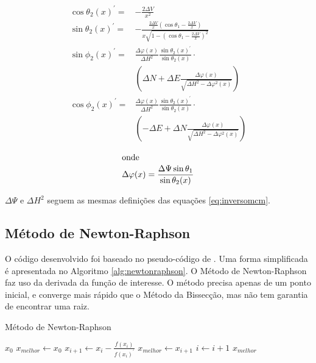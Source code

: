 \documentclass[final,5p]{elsarticle}
\numberwithin{equation}{section}
\begin{document}
    \begin{subequations}\label{eq:inversomcmprime}
    \begin{align}
        \cos \theta_2(x)^{\prime} =& - \frac{2 \Delta V}{x^2} \label{eq:costheta2prime} \\
        \sin \theta_2(x)^{\prime} =& - \frac{\frac{2 \Delta V}{x}(\cos \theta_1 - \frac{2 \Delta V}{x})}{x \sqrt{1-\left(\cos \theta_1 - \frac{2 \Delta V}{x} \right)^2}} \label{eq:sintheta2prime} \\
        \sin \phi_2(x)^{\prime} =& \frac{\Delta \varphi(x)}{\Delta H^2} \frac{\sin \theta_2(x)^{\prime}}{\sin \theta_2(x)} \cdot \nonumber \\
        &\left( \Delta N + \Delta E \frac{\Delta \varphi(x)}{\sqrt{\Delta H^2 - \Delta \varphi^2(x)}} \right) \label{eq:sinphi2prime} \\
        \cos \phi_2(x)^{\prime} =& \frac{\Delta \varphi(x)}{\Delta H^2} \frac{\sin \theta_2(x)^{\prime}}{\sin \theta_2(x)} \cdot \nonumber \\
        &\left( -\Delta E + \Delta N \frac{\Delta \varphi(x)}{\sqrt{\Delta H^2 - \Delta \varphi^2(x)}} \right)   \label{eq:cosphi2prime}
    \end{align}
    \end{subequations}

    \begin{align*}
    \intertext{onde}
        \Delta \varphi(x)  = \frac{\Delta \Psi \sin \theta_1}{\sin \theta_2(x)}
    \end{align*}


    $\Delta \Psi$ e $\Delta H^2$ seguem as mesmas definições das equações \ref{eq:inversomcm}.


    \subsection{Método de Newton-Raphson}
    
    O código desenvolvido foi baseado no pseudo-código de \cite{burden2016analise}. Uma forma simplificada é apresentada no Algoritmo \ref{alg:newtonraphson}. O Método de Newton-Raphson faz uso da derivada da função de interesse. O método precisa apenas de um ponto inicial, e converge mais rápido que o Método da Bissecção, mas não tem garantia de encontrar uma raiz. 

    \begin{algorithm}
        \caption{Método de Newton-Raphson}\label{alg:newtonraphson}
        \begin{algorithmic}
            \Require $x_0$
            \State $x_{melhor} \gets x_{0}$
            \Repeat
                \State $x_{i+1} \gets x_i - \frac{f(x_i)}{f(x_i)^{\prime}}$
                    \State $x_{melhor} \gets x_{i+1}$
                \EndIf
                \State $i \gets i+1$
            \State \Return $x_{melhor}$
        \end{algorithmic}
    \end{algorithm}
\end{document}
